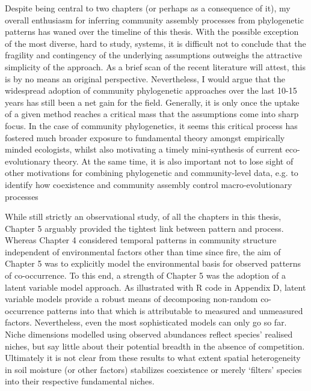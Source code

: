 Despite being central to two chapters (or perhaps as a consequence of it), my overall enthusiasm for inferring community assembly processes from phylogenetic patterns has waned over the timeline of this thesis. With the possible exception of the most diverse, hard to study, systems, it is difficult not to conclude that the fragility and contingency of the underlying assumptions outweighs the attractive simplicity of the approach. As a brief scan of the recent literature will attest, this is by no means an original perspective. Nevertheless, I would argue that the widespread adoption of community phylogenetic approaches over the last 10-15 years has still been a net gain for the field. Generally, it is only once the uptake of a given method reaches a critical mass that the assumptions come into sharp focus. In the case of community phylogenetics, it seems this critical process has fostered much broader exposure to fundamental theory amongst empirically minded ecologists, whilst also motivating a timely mini-synthesis of current eco-evolutionary theory. At the same time, it is also important not to lose sight of other motivations for combining phylogenetic and community-level data, e.g. to identify how coexistence and community assembly control macro-evolutionary processes \citep{Gerhold2015}  

While still strictly an observational study, of all the chapters in this thesis, Chapter 5 arguably provided the tightest link between pattern and process. Whereas Chapter 4 considered temporal patterns in community structure independent of environmental factors other than time since fire, the aim of Chapter 5 was to explicitly model the environmental basis for observed patterns of co-occurrence. To this end, a strength of Chapter 5 was the adoption of a latent variable model approach. As illustrated with R code in Appendix D, latent variable models provide a robust means of decomposing non-random co-occurrence patterns into that which is attributable to measured and unmeasured factors. Nevertheless, even the most sophisticated models can only go so far. Niche dimensions modelled using observed abundances reflect species' realised niches, but say little about their potential breadth in the absence of competition. Ultimately it is not clear from these results to what extent spatial heterogeneity in soil moisture (or other factors) stabilizes coexistence or merely `filters' species into their respective fundamental niches. 


